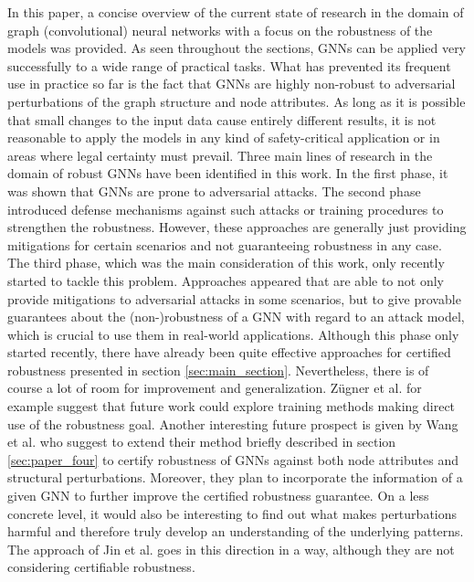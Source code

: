\documentclass[a4paper,preprint]{sig-alternate}
\begin{document}
In this paper, a concise overview of the current state of research in the domain of graph (convolutional) neural networks with a focus on the robustness 
of the models was provided. As seen throughout the sections, GNNs can be applied very successfully to a wide range of practical tasks.
What has prevented its frequent use in practice so far is the fact that GNNs are highly non-robust to adversarial perturbations of the graph structure
and node attributes. As long as it is possible that small changes to the input data cause entirely different results, it is not reasonable to
apply the models in any kind of safety-critical application or in areas where legal certainty must prevail.\newline
Three main lines of research in the domain of robust GNNs have been identified in this work. In the first phase, it was shown that GNNs are prone to adversarial attacks.
The second phase introduced defense mechanisms against such attacks or training procedures to strengthen the robustness. However, these approaches
are generally just providing mitigations for certain scenarios and not guaranteeing robustness in any case.
The third phase, which was the main consideration of this work, only recently started to tackle this problem. 
Approaches appeared that are able to not only provide mitigations to adversarial attacks in some scenarios, but to give provable guarantees about 
the (non-)robustness of a GNN with regard to an attack model, which is crucial to use them in real-world applications.\newline
Although this phase only started recently, there have already been quite effective approaches for certified robustness presented in section \ref{sec:main_section}.
Nevertheless, there is of course a lot of room for improvement and generalization.
Zügner et al. \cite{10.1145/3394486.3403217} for example suggest that future work could explore training methods making direct use of the robustness goal.
Another interesting future prospect is given by Wang et al. \cite{trivedi2017knowevolve} who suggest to extend their method briefly described in 
section \ref{sec:paper_four} to certify robustness of GNNs against both node attributes and structural perturbations.
Moreover, they plan to incorporate the information of a given GNN to further improve the certified robustness guarantee.\newline
On a less concrete level, it would also be interesting to find out what makes perturbations harmful and therefore
truly develop an understanding of the underlying patterns.
The approach of Jin et al. \cite{Jin_2020_Graph} goes in this direction in a way, although they are not considering certifiable robustness.
\end{document}

